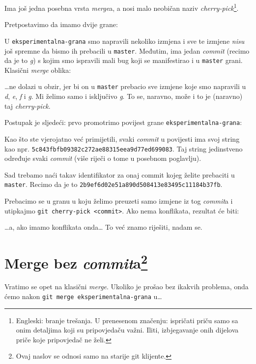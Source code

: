 Ima još jedna posebna vrsta \emph{merge}a, a nosi malo neobičan naziv \emph{cherry-pick}\footnote{Engleski: branje trešanja. U prenesenom značenju: ispričati priču samo sa onim detaljima koji su pripovjedaču važni. Iliti, izbjegavanje onih dijelova priče koje pripovjedač ne želi.}.

Pretpostavimo da imamo dvije grane:



U \verb+eksperimentalna-grana+ smo napravili nekoliko izmjena i sve te izmjene \emph{nisu} još spremne da bismo ih prebacili u \verb+master+.
Međutim, ima jedan \emph{commit} (recimo da je to \emph g) s kojim smo ispravili mali bug koji se manifestirao i u \verb+master+ grani.
Klasični \emph{merge} oblika:



\dots{}ne dolazi u obzir, jer bi on u \verb+master+ prebacio sve izmjene koje smo napravili u \emph d, \emph e, \emph f i \emph g.
Mi želimo samo i isključivo \emph g.
To se, naravno, može i to je (naravno) taj \emph{cherry-pick}.

Postupak je sljedeći: prvo promotrimo povijest grane \verb+eksperimentalna-grana+:



Kao što ste vjerojatno već primijetili, svaki \emph{commit} u povijesti ima svoj string kao npr. \verb+5c843fbfb09382c272ae88315eea9d77ed699083+.
Taj string jedinstveno određuje svaki \emph{commit} (više riječi o tome u posebnom poglavlju).

Sad trebamo naći takav identifikator za onaj commit kojeg želite prebaciti u \verb+master+. Recimo da je to \verb+2b9ef6d02e51a890d508413e83495c11184b37fb+.

Prebacimo se u granu u koju želimo preuzeti samo izmjene iz tog \emph{commit}a i utipkajmo \verb+git cherry-pick <commit>+.
Ako nema konflikata, rezultat će biti:



\dots{}a, ako imamo konflikata onda\dots 
To već znamo riješiti, nadam se.

\section*{Merge bez \emph{commit}a\footnote{Ovaj naslov se odnosi samo na starije git klijente.}}

Vratimo se opet na klasični \emph{merge}.
Ukoliko je prošao bez ikakvih problema, onda ćemo nakon \verb+git merge eksperimentalna-grana+ u\dots

